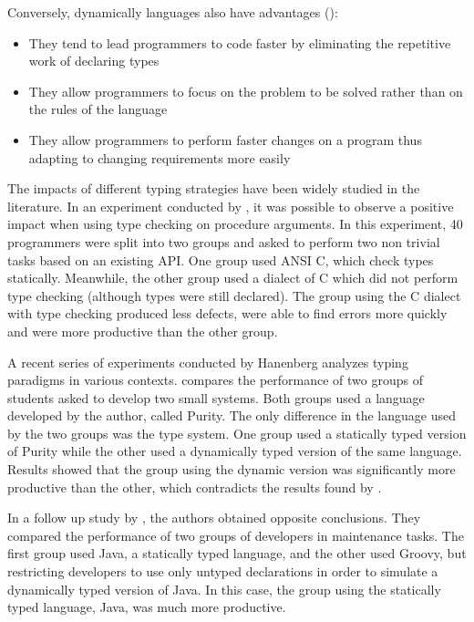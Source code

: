 \documentclass[msc]{ppgccufmg}
\begin{document}
Conversely, dynamically languages also have advantages (\cite{types_and_programming_languages, dynamically_typed_languages}):
\begin{itemize}
	\item They tend to lead programmers to code faster by eliminating the repetitive work of declaring types
	\item They allow programmers to focus on the problem to be solved rather than on the rules of the language 
	\item They allow programmers to perform faster changes on a program thus adapting to changing requirements more easily
\end{itemize}

The impacts of different typing strategies have been widely studied in the literature.
In an experiment conducted by \cite{Prechelt98}, it was possible to observe a positive impact when using type checking on procedure arguments.
In this experiment, 40 programmers were split into two groups and asked to perform two non trivial tasks based on an existing API.
One group used ANSI C, which check types statically.
Meanwhile, the other group used a dialect of C which did not perform type checking (although types were still declared).
The group using the C dialect with type checking produced less defects, were able to find errors more quickly and were more productive than the other group.

A recent series of experiments conducted by Hanenberg analyzes typing paradigms in various contexts.
\cite{experiment_with_purity} compares the performance of two groups of students asked to develop two small systems. 
Both groups used a language developed by the author, called Purity. 
The only difference in the language used by the two groups was the type system.
One group used a statically typed version of Purity while the other used a dynamically typed version of the same language.
Results showed that the group using the dynamic version was significantly more productive than the other, which contradicts the results found by \cite{Prechelt98}. 

In a follow up study by \cite{hanenberg_icpc}, the authors obtained opposite conclusions. 
They compared the performance of two groups of developers in maintenance tasks. 
The first group used Java, a statically typed language, and the other used Groovy, but restricting developers to use only untyped declarations in order to simulate a dynamically typed version of Java.
In this case, the group using the statically typed language, Java, was much more productive.
\end{document}
